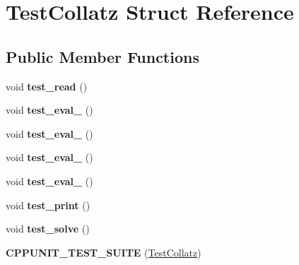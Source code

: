 \hypertarget{structTestCollatz}{
\section{TestCollatz Struct Reference}
\label{structTestCollatz}
}
\subsection*{Public Member Functions}
\begin{DoxyCompactItemize}
\item 
\hypertarget{structTestCollatz_aed249753cb58d6839d4418ebe4b6febe}{
void {\bfseries test\_\-read} ()}
\label{structTestCollatz_aed249753cb58d6839d4418ebe4b6febe}

\item 
\hypertarget{structTestCollatz_a6cbed0c21b9629f8d976aefd3227738b}{
void {\bfseries test\_\-eval\_} ()}
\label{structTestCollatz_a6cbed0c21b9629f8d976aefd3227738b}

\item 
\hypertarget{structTestCollatz_af4a13ed69e43facf22351fbce1b2151d}{
void {\bfseries test\_\-eval\_} ()}
\label{structTestCollatz_af4a13ed69e43facf22351fbce1b2151d}

\item 
\hypertarget{structTestCollatz_a81bdbc92410e8a5ba713a5584983f5fe}{
void {\bfseries test\_\-eval\_} ()}
\label{structTestCollatz_a81bdbc92410e8a5ba713a5584983f5fe}

\item 
\hypertarget{structTestCollatz_adcaeeabf4b06da3ec214f982b5b79ba3}{
void {\bfseries test\_\-eval\_} ()}
\label{structTestCollatz_adcaeeabf4b06da3ec214f982b5b79ba3}

\item 
\hypertarget{structTestCollatz_ace68f32bbe93b937ce916a282277fb10}{
void {\bfseries test\_\-print} ()}
\label{structTestCollatz_ace68f32bbe93b937ce916a282277fb10}

\item 
\hypertarget{structTestCollatz_a78b32481bc06045bd450607863f2321d}{
void {\bfseries test\_\-solve} ()}
\label{structTestCollatz_a78b32481bc06045bd450607863f2321d}

\item 
\hypertarget{structTestCollatz_ac4ec85f811e9e88fa6af5a3220f6b7fe}{
{\bfseries CPPUNIT\_\-TEST\_\-SUITE} (\hyperlink{structTestCollatz}{TestCollatz})}
\label{structTestCollatz_ac4ec85f811e9e88fa6af5a3220f6b7fe}


\end{DoxyCompactItemize}

